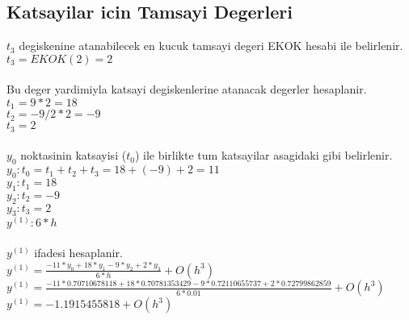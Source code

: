 \documentclass{article}
\begin{document}
\subsection{Katsayilar icin Tamsayi Degerleri}
$t_{3}$ degiskenine atanabilecek en kucuk tamsayi degeri EKOK hesabi ile belirlenir.\\
$t_{3}=EKOK(2)=2$\\
\\
Bu deger yardimiyla katsayi degiskenlerine atanacak degerler hesaplanir.\\
$\displaystyle t_{1}=9*2=18$\\
$\displaystyle t_{2}=-9/2*2=-9$\\
$\displaystyle t_{3}=2$\\
\\
$y_{0}$ noktasinin katsayisi ($t_{0}$) ile birlikte tum katsayilar asagidaki gibi belirlenir.\\
$y_{0}: t_{0}=t_{1}+t_{2}+t_{3}=18+(-9)+2=11$\\
$y_{1}: t_{1}=18$\\
$y_{2}: t_{2}=-9$\\
$y_{3}: t_{3}=2$\\
$y^{(1)}: 6*h$\\
\\
$y^{(1)}$ ifadesi hesaplanir.\\
$y^{(1)}=\frac{-11*y_{0}+18*y_{1}-9*y_{2}+2*y_{3}}{6*h}+O(h^{3})$\\
$y^{(1)}=\frac{-11*0.70710678118+18*0.70781353429-9*0.72110655737+2*0.72799862859}{6*0.01}+O(h^{3})$\\
$y^{(1)}=-1.1915455818+O(h^{3})$\\
\end{document}
